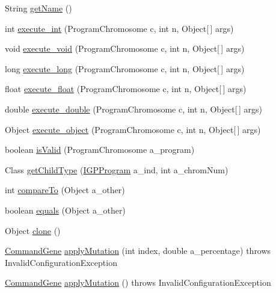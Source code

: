 \begin{DoxyCompactItemize}
\item 
String \hyperlink{classorg_1_1jgap_1_1gp_1_1function_1_1_sub_program_aeb2cae5019b4d2ad16c477197792d90e}{get\-Name} ()
\item 
int \hyperlink{classorg_1_1jgap_1_1gp_1_1function_1_1_sub_program_a310c68bd816320dab6cf5c797ef398dc}{execute\-\_\-int} (Program\-Chromosome c, int n, Object\mbox{[}$\,$\mbox{]} args)
\item 
void \hyperlink{classorg_1_1jgap_1_1gp_1_1function_1_1_sub_program_a6d8e0b323c21b311572bde0fcb8ea3e3}{execute\-\_\-void} (Program\-Chromosome c, int n, Object\mbox{[}$\,$\mbox{]} args)
\item 
long \hyperlink{classorg_1_1jgap_1_1gp_1_1function_1_1_sub_program_a9e6393ed89fd811c8cb0f8ef6a9ba66d}{execute\-\_\-long} (Program\-Chromosome c, int n, Object\mbox{[}$\,$\mbox{]} args)
\item 
float \hyperlink{classorg_1_1jgap_1_1gp_1_1function_1_1_sub_program_aabc06337beb1e842f2adb8db3eac903b}{execute\-\_\-float} (Program\-Chromosome c, int n, Object\mbox{[}$\,$\mbox{]} args)
\item 
double \hyperlink{classorg_1_1jgap_1_1gp_1_1function_1_1_sub_program_a6d360cd6cac14458bcb134d8619ca0fc}{execute\-\_\-double} (Program\-Chromosome c, int n, Object\mbox{[}$\,$\mbox{]} args)
\item 
Object \hyperlink{classorg_1_1jgap_1_1gp_1_1function_1_1_sub_program_adaf148b8ea8930d982471e8869a49022}{execute\-\_\-object} (Program\-Chromosome c, int n, Object\mbox{[}$\,$\mbox{]} args)
\item 
boolean \hyperlink{classorg_1_1jgap_1_1gp_1_1function_1_1_sub_program_aa84676a387649191d1fdbb9205ff7c1b}{is\-Valid} (Program\-Chromosome a\-\_\-program)
\item 
Class \hyperlink{classorg_1_1jgap_1_1gp_1_1function_1_1_sub_program_ad22bdb6518f78b484d7e706f552f1d8e}{get\-Child\-Type} (\hyperlink{interfaceorg_1_1jgap_1_1gp_1_1_i_g_p_program}{I\-G\-P\-Program} a\-\_\-ind, int a\-\_\-chrom\-Num)
\item 
int \hyperlink{classorg_1_1jgap_1_1gp_1_1function_1_1_sub_program_a5aa61a315f7421aae1d61759047fdcd6}{compare\-To} (Object a\-\_\-other)
\item 
boolean \hyperlink{classorg_1_1jgap_1_1gp_1_1function_1_1_sub_program_a01a1b1b0587865ce4cd18f02397e29ab}{equals} (Object a\-\_\-other)
\item 
Object \hyperlink{classorg_1_1jgap_1_1gp_1_1function_1_1_sub_program_a10845f9e8f5a5bb0a1d9b2eb33886eb3}{clone} ()
\item 
\hyperlink{classorg_1_1jgap_1_1gp_1_1_command_gene}{Command\-Gene} \hyperlink{classorg_1_1jgap_1_1gp_1_1function_1_1_sub_program_a3eb014168eb8b158721776f35f0692e5}{apply\-Mutation} (int index, double a\-\_\-percentage)  throws Invalid\-Configuration\-Exception 
\item 
\hyperlink{classorg_1_1jgap_1_1gp_1_1_command_gene}{Command\-Gene} \hyperlink{classorg_1_1jgap_1_1gp_1_1function_1_1_sub_program_a9ef69a70d4ce63696a5825e6f1bbaae8}{apply\-Mutation} ()  throws Invalid\-Configuration\-Exception 
\end{DoxyCompactItemize}
